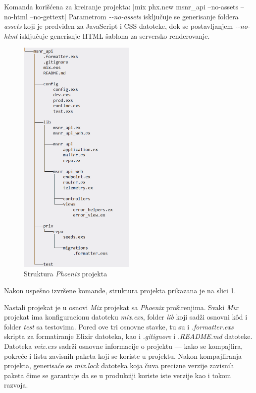 \documentclass[12pt,oneside]{memoir}
\begin{document}
Komanda korišćena za kreiranje projekta:
|mix phx.new msnr_api --no-assets --no-html --no-gettext|
\noindent Parametrom \emph{-{}-no-assets} isključuje se generisanje foldera \emph{assets} koji je predviđen za JavaScript i CSS datoteke,
dok se postavljanjem \emph{-{}-no-html} isključuje generisnje HTML šablona za serversko renderovanje.
\begin{figure}[!h]
  \centering
  \includegraphics[width=0.5\textwidth]{msnr-dir.png}
  \caption{Struktura \emph{Phoenix} projekta}
  \label{fig:msnr-dir}
\end{figure}
Nakon uspešno izvršene komande, struktura projekta prikazana je na slici \ref{fig:msnr-dir}.

Nastali projekat je u osnovi \emph{Mix} projekat sa \emph{Phoenix} proširenjima. Svaki \emph{Mix} projekat ima
konfiguracionu datoteku \emph{mix.exs}, folder \emph{lib} koji sadži osnovni k\^{o}d i folder \emph{test} sa testovima.
Pored ove tri osnovne stavke, tu su i \emph{.formatter.exs} skripta za formatiranje Elixir datoteka, kao i \emph{.gitignore} i
\emph{.README.md} datoteke. Datoteka \emph{mix.exs} sadrži osnovne informacije o projektu --- kako se kompajlira, pokreće i 
listu zavisnih paketa koji se koriste u projektu. Nakon kompajliranja projekta, generisaće se \emph{mix.lock} datoteka koja
čuva precizne verzije zavisnih paketa čime se garantuje da se u produkciji koriste iste verzije kao i tokom razvoja.
\end{document}
